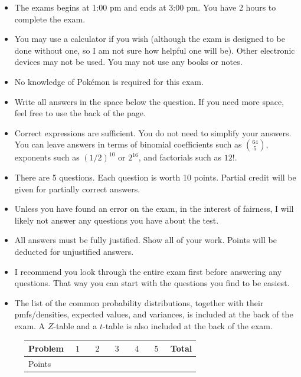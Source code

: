 \documentclass[12pt]{article}
\begin{document}
\begin{itemize}
\item The exams begins at 1:00 pm and ends at 3:00 pm. You have 2 hours to complete the exam.
\item You may use a calculator if you wish (although the exam is designed to be done without one, so I am not sure how helpful one will be). Other electronic devices may not be used. You may not use any books or notes. 
\item No knowledge of Pok\'emon is required for this exam.
\item Write all answers in the space below the question. If you need more space, feel free to use the back of the page.
\item Correct expressions are sufficient. You do not need to simplify your answers. You can leave answers in terms of binomial coefficients such as $\binom{64}{5}$, exponents such as $(1/2)^{10}$ or $2^{16}$, and factorials such as $12!$.
\item There are 5 questions. Each question is worth 10 points. Partial credit will be given for partially correct answers.
\item Unless you have found an error on the exam, in the interest of fairness, I will likely not answer any questions you have about the test.
\item All answers must be fully justified. Show all of your work. Points will be deducted for unjustified answers.
\item I recommend you look through the entire exam first before answering any questions. That way you can start with the questions you find to be easiest.
\item The list of the common probability distributions, together with their pmfs/densities, expected values, and variances, is included at the back of the exam. A $Z$-table and a $t$-table is also included at the back of the exam.
\end{itemize}

\begin{figure}[H]
\centering
\label{my-label}
\begin{tabular}{|l|l|l|l|l|l|l|}
\hline
Problem & $\:\:1\:\:$ & $\:\:2\:\:$ & $\:\:3\:\:$ & $\:\:4\:\:$ & $\:\:5\:\:$ & Total \\ \hline
Points  &   &   &   &   &   &       \\ \hline
\end{tabular}
\end{figure}

\pagebreak
\end{document}
